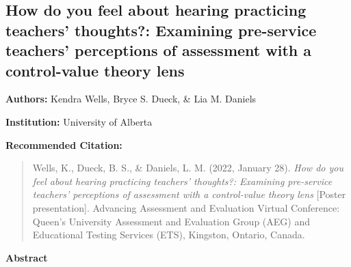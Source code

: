 \documentclass[
]{book}
\begin{document}
\newpage

\hypertarget{how-do-you-feel-about-hearing-practicing-teachers-thoughts-examining-pre-service-teachers-perceptions-of-assessment-with-a-control-value-theory-lens}{%
\subsection{How do you feel about hearing practicing teachers' thoughts?: Examining pre-service teachers' perceptions of assessment with a control-value theory lens}\label{how-do-you-feel-about-hearing-practicing-teachers-thoughts-examining-pre-service-teachers-perceptions-of-assessment-with-a-control-value-theory-lens}}

\textbf{Authors:} Kendra Wells, Bryce S. Dueck, \& Lia M. Daniels

\textbf{Institution:} University of Alberta

\textbf{Recommended Citation:}

\begin{quote}
Wells, K., Dueck, B. S., \& Daniels, L. M. (2022, January 28). \emph{How do you feel about hearing practicing teachers' thoughts?: Examining pre-service teachers' perceptions of assessment with a control-value theory lens} {[}Poster presentation{]}. Advancing Assessment and Evaluation Virtual Conference: Queen's University Assessment and Evaluation Group (AEG) and Educational Testing Services (ETS), Kingston, Ontario, Canada.
\end{quote}

\textbf{Abstract}
\end{document}

